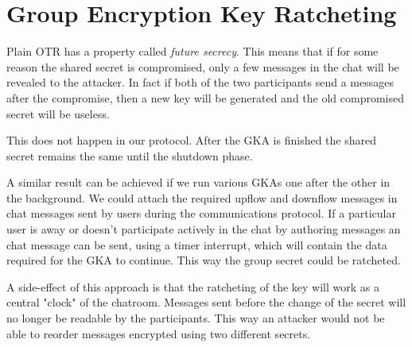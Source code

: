 \section{Group Encryption Key Ratcheting}

Plain OTR has a property called \emph{future secrecy}.
This means that if for some reason the shared secret is compromised, only a few messages in the chat will be revealed to the attacker.
In fact if both of the two participants send a messages after the compromise, then a new key will be generated and the old compromised secret will be useless.

This does not happen in our protocol.
After the GKA is finished the shared secret remains the same until the shutdown phase.

A similar result can be achieved if we run various GKAs one after the other in the background.
We could attach the required upflow and downflow messages in chat messages sent by users during the communications protocol.
If a particular user is away or doesn't participate actively in the chat by authoring messages an chat message can be sent, using a timer interrupt, which will contain the data required for the GKA to continue.
This way the group secret could be ratcheted.

A side-effect of this approach is that the ratcheting of the key will work as a central "clock" of the chatroom.
Messages sent before the change of the secret will no longer be readable by the participants.
This way an attacker would not be able to reorder messages encrypted using two different secrets.
